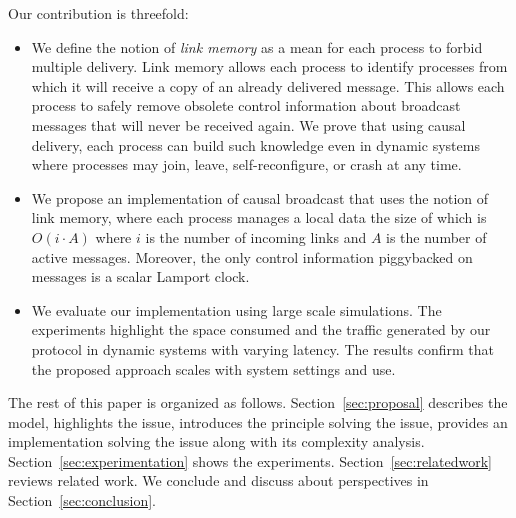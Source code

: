 \noindent Our contribution is threefold:
\begin{itemize}[leftmargin=*]
\item We define the notion of \emph{link memory} as a mean for each process to
  forbid multiple delivery.  Link memory allows each process to identify
  processes from which it will receive a copy of an already delivered
  message. This allows each process to safely remove obsolete control
  information about broadcast messages that will never be received again. We
  prove that using causal delivery, each process can build such knowledge even
  in dynamic systems where processes may join, leave, self-reconfigure, or crash
  at any time.
\item We propose an implementation of causal broadcast that uses the notion of
  link memory, where each process manages a local data the size of which is
  $O(i \cdot A)$ where $i$ is the number of incoming links and $A$ is the number
  of active messages. Moreover, the only control information piggybacked on
  messages is a scalar Lamport clock.
\item We evaluate our implementation using large scale simulations. The
  experiments highlight the space consumed and the traffic generated by our
  protocol in dynamic systems with varying latency. The results confirm that the
  proposed approach scales with system settings and use.
\end{itemize}

The rest of this paper is organized as follows.  Section~\ref{sec:proposal}
describes the model, highlights the issue, introduces the principle solving the
issue, provides an implementation solving the issue along with its complexity
analysis. Section~\ref{sec:experimentation} shows the
experiments. Section~\ref{sec:relatedwork} reviews related work. We conclude and
discuss about perspectives in Section~\ref{sec:conclusion}.


